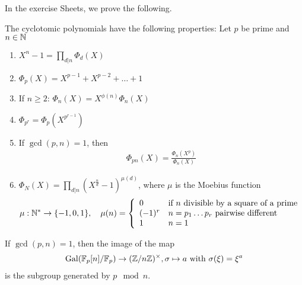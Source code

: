 In the exercise Sheets, we prove the following.
\begin{prop}[]\label{prop:4-23}
The cyclotomic polynomials have the following properties:
Let $p$ be prime and $n \in\mathbb{N}$
\begin{enumerate}
  \item $X^{n}-1 = \prod_{d|n}\Phi_d(X)$
  \item $\Phi_p(X) = X^{p-1} + X^{p-2} + \ldots + 1$
  \item If $n \geq 2$: $\Phi_n(X) = X^{\phi(n)}\Phi_n(X)$
  \item $\Phi_{p^{r}} = \Phi_p(X^{p^{r-1}})$
  \item If $\gcd(p,n)=1$, then
    \begin{align*}
      \Phi_{pn}(X) = \frac{\Phi_n(X^{p})}{\Phi_n(X)}
    \end{align*}
  \item $\Phi_N(X) = \prod_{d|n}(X^{\frac{n}{d}} - 1)^{\mu(d)}$, where $\mu$ is the Moebius function
    \begin{align*}
      \mu: \mathbb{N}^{\ast} \to  \{-1,0,1\}, \quad \mu(n) = \left\{\begin{array}{ll}
        0 & \text{if $n$ divisible by a square of a prime}\\
        (-1)^{r} & n= p_1 \dots p_r \text{ pairwise different}\\
        1 & n=1
      \end{array} \right.
    \end{align*}
\end{enumerate}
\end{prop}

\begin{thm}[]\label{thm:4-30}
  If $\gcd(p,n)=1$, then the image of the map
  \begin{align*}
    \operatorname{Gal}(\mathbb{F}_p[n]/\mathbb{F}_p) \to (\mathbb{Z}/n\mathbb{Z})^{\times}, \sigma \mapsto  a \text{ with } \sigma(\xi) = \xi^{a}
  \end{align*}
  is the subgroup generated by $p \mod n$.
\end{thm}

